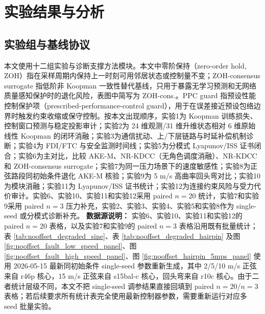 \documentclass[twocolumn,3p,times,procedia]{elsarticle}
\newif\ifNRReview
\newcommand{\reviewblock}[1]{\ifNRReview\par\smallskip\noindent\begingroup\setlength{\fboxsep}{4pt}\colorbox{yellow!35}{\parbox{0.96\linewidth}{\footnotesize\textbf{当前不足：} #1}}\endgroup\par\smallskip\fi}
\newcommand{\AKE}{AKE-M}
\newcommand{\Method}{NR-KDCC}
\begin{document}
\reviewblock{实验11的证书统计只能作为证书裕度和 ok ratio 的闭环证据，不能替代理论证明，也不能推出所有场景全局渐近稳定。旧版全场景聚合统计中 nominal 和 single-fault 出现负最小裕度；本轮分模式压力场景证据显示 high-communication-noise 与 mixed fault/noise 中 nominal/FTC 模式均为正裕度。因此稳定性 claim 应限定为有界工作域内的 ISS/UUB 实践有界。}

\section{实验结果与分析}

\subsection{实验组与基线协议}

本文使用十二组实验与诊断支撑方法模块。本文中零阶保持（zero-order hold, ZOH）指在采样周期内保持上一时刻可用邻居状态或控制量不变；ZOH-consensus surrogate 指低阶非 Koopman 一致性替代基线，只用于暴露无学习预测和无网络质量感知保护时的退化风险，表图中简写为 ZOH-cons.。PPC guard 指预设性能控制保护项（prescribed-performance-control guard），用于在误差接近预设包络边界时触发约束收缩或保守控制。按本文出现顺序，实验1为 Koopman 训练损失、控制窗口预测与稳定投影审计；实验2为 24 维观测/31 维升维状态相对 6 维原始线性 Koopman 的闭环消融；实验3为通信扰动、上/下层链路与时延补偿机制诊断；实验4为 FDI/FTC 与安全监测时间线；实验5为分模式 Lyapunov/ISS 证书闭合；实验6为主对比，比较 \AKE{}、\Method{}（无角色调度消融）、\Method{} 和 ZOH-consensus surrogate；实验7为同一压力场景下的速度敏感性；实验8为正弦路段同初始条件退化 AKE-M 核验；实验9为 5 m/s 高曲率回头弯对比；实验10为模块消融；实验11为 Lyapunov/ISS 证书统计；实验12为连接约束风险与受力代价审计。实验6、实验10、实验11和实验12采用 paired $n=20$ 统计，实验7和实验9采用 paired $n=3$ 压力补充，实验2、实验3、实验4、实验5和实验8作为 single-seed 或分模式诊断补充。
\textbf{数据源说明：} 实验6、实验10、实验11和实验12的 paired $n=20$ 表格，以及实验7和实验9的 paired $n=3$ 表格沿用既有批量统计；表 \ref{tab:nooffset_degraded_sine}、表 \ref{tab:nooffset_degraded_hairpin} 及图 \ref{fig:nooffset_fault_low_speed_panel}、图 \ref{fig:nooffset_fault_high_speed_panel}、图 \ref{fig:nooffset_hairpin_5mps_panel} 使用 2026-05-15 最新同初始条件 single-seed 参数重新生成，其中 2/5/10 m/s 正弦来自 r46p 核心，15 m/s 正弦来自 s15bal-c 核心，回头弯来自 r10c 核心。由于二者统计层级不同，本文不把 single-seed 调参结果直接回填到 paired $n=20$/$n=3$ 表格；若后续要求所有统计表完全使用最新控制器参数，需要重新运行对应多 seed 批量实验。
\reviewblock{FDI/FTC 和 phase-role 尚未形成完全独立的多 seed 消融；实验3和实验2是 single-seed 诊断补充，不能与 paired $n=20$ 主结果同等强度使用。Koopman 模块目前支撑控制窗口内闭环收益和短窗口预测可比，不支撑远期开环 rollout 全面优势。}
\end{document}
